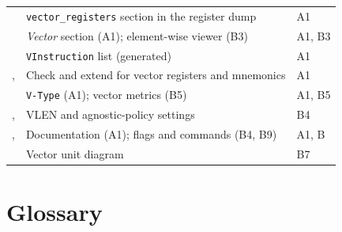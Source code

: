 \documentclass[11pt]{article}
\begin{document}
\begin{longtable}{@{}L{5.8cm}L{7.6cm}L{1.6cm}@{}}
 & \texttt{vector\_registers} section in the register dump & A1 \\
 & \emph{Vector} section (A1); element-wise viewer (B3) & A1, B3 \\
 & \texttt{VInstruction} list (generated) & A1 \\
,  & Check and extend for vector registers and mnemonics & A1 \\
 & \texttt{V-Type} (A1); vector metrics (B5) & A1, B5 \\
,  & VLEN and agnostic-policy settings & B4 \\
,  & Documentation (A1); flags and commands (B4, B9) & A1, B \\
 & Vector unit diagram & B7 \\
\bottomrule
\end{longtable}
\normalsize

\section{Glossary}\label{app:glossary}
\end{document}
